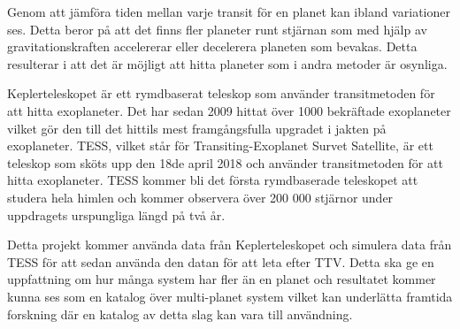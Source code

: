 \documentclass[12pt]{report}
\begin{document}
	Genom att jämföra tiden mellan varje transit för en planet kan ibland variationer ses. Detta beror på att det finns fler planeter runt stjärnan som med hjälp av gravitationskraften accelererar eller decelerera planeten som bevakas. Detta resulterar i att det är möjligt att hitta planeter som i andra metoder är osynliga. 
	
	Keplerteleskopet är ett rymdbaserat teleskop som använder transitmetoden för att hitta exoplaneter. Det har sedan 2009 hittat över 1000 bekräftade exoplaneter vilket gör den till det hittils mest framgångsfulla upgradet i jakten på exoplaneter. TESS, vilket står för Transiting-Exoplanet Survet Satellite, är ett teleskop som sköts upp den 18de april 2018 och använder transitmetoden för att hitta exoplaneter. TESS kommer bli det första rymdbaserade teleskopet att studera hela himlen och kommer observera över 200 000 stjärnor under uppdragets urspungliga längd på två år.
	
	Detta projekt kommer använda data från Keplerteleskopet och simulera data från TESS för att sedan använda den datan för att leta efter TTV. Detta ska ge en uppfattning om hur många system har fler än en planet och resultatet kommer kunna ses som en katalog över multi-planet system vilket kan underlätta framtida forskning där en katalog av detta slag kan vara till användning.
	
	



\newpage

\thispagestyle{empty}
\mbox{} %

\newpage

\setcounter{page}{1} %

\tableofcontents

\newpage

\listoffigures 
\listoftables

\newpage
\end{document}
